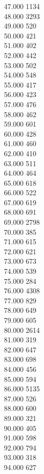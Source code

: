 { 47.000	1134 \\
 48.000	3293 \\
 49.000	520 \\
 50.000	421 \\
 51.000	402 \\
 52.000	442 \\
 53.000	502 \\
 54.000	548 \\
 55.000	417 \\
 56.000	423 \\
 57.000	476 \\
 58.000	462 \\
 59.000	601 \\
 60.000	428 \\
 61.000	460 \\
 62.000	410 \\
 63.000	511 \\
 64.000	464 \\
 65.000	618 \\
 66.000	522 \\
 67.000	619 \\
 68.000	691 \\
 69.000	2798 \\
 70.000	385 \\
 71.000	615 \\
 72.000	621 \\
 73.000	673 \\
 74.000	539 \\
 75.000	284 \\
 76.000	4308 \\
 77.000	829 \\
 78.000	649 \\
 79.000	605 \\
 80.000	2614 \\
 81.000	319 \\
 82.000	647 \\
 83.000	698 \\
 84.000	456 \\
 85.000	594 \\
 86.000	5135 \\
 87.000	526 \\
 88.000	600 \\
 89.000	321 \\
 90.000	405 \\
 91.000	598 \\
 92.000	794 \\
 93.000	318 \\
 94.000	627 \\
}
